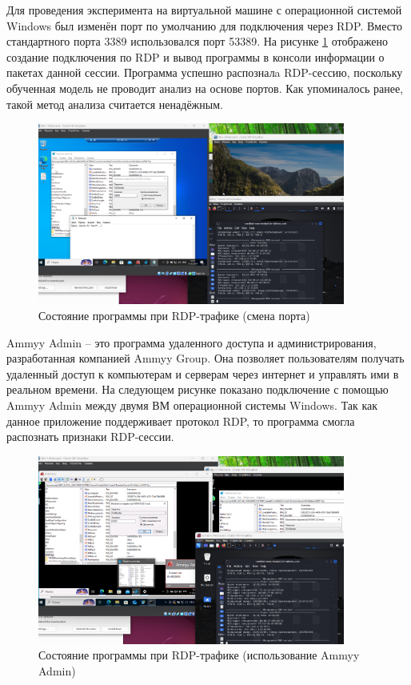 \documentclass[bachelor, och, coursework]{SCWorks}
\begin{document}
Для проведения эксперимента на виртуальной машине с операционной системой Windows был изменён порт по умолчанию для 
подключения через RDP. Вместо стандартного порта 3389 использовался порт 53389. На рисунке \ref{rdp2} отображено создание 
подключения по RDP и вывод программы в консоли информации о пакетах данной сессии. Программа успешно распозналa RDP-сессию, 
поскольку обученная модель не проводит анализ на основе портов. Как упоминалось ранее, такой метод анализа считается ненадёжным.

\begin{figure}[H]
  \centering
  \includegraphics[width=0.9\textwidth]{pics/8rdp.png}
  \caption{Состояние программы при RDP-трафике (смена порта)}
  \label{rdp2}
\end{figure}

Ammyy Admin -- это программа удаленного доступа и администрирования, разработанная компанией Ammyy Group. Она 
позволяет пользователям получать удаленный доступ к компьютерам и серверам через интернет и управлять ими 
в реальном времени. На следующем рисунке показано подключение с помощью Ammyy Admin между двумя ВМ операционной системы Windows. 
Так как данное приложение поддерживает протокол RDP, то программа смогла распознать признаки RDP-сессии.


\begin{figure}[H]
  \centering
  \includegraphics[width=0.9\textwidth]{pics/9ammyy.png}
  \caption{Состояние программы при RDP-трафике (использование Ammyy Admin)}
  \label{ammyy1}
\end{figure}
\end{document}
